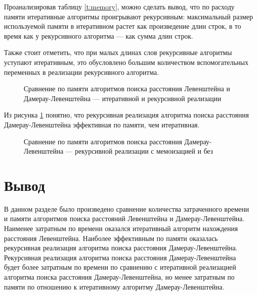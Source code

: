 Проанализировав таблицу \ref{t:memory}, можно сделать вывод, что по расходу памяти итеративные алгоритмы 
проигрывают рекурсивным: максимальный размер используемой памяти в итеративном растет как произведение длин строк,
в то время как у рекурсивного алгоритма — как сумма длин строк.

Также стоит отметить, что при малых длинах слов рекурсивные алгоритмы уступают итеративным, это обусловлено большим 
количеством вспомогательных переменных в реализации рекурсивного алгоритма.

\begin{figure}[H]
	\centering
	
	\caption{Сравнение по памяти алгоритмов поиска расстояния Левенштейна и Дамерау-Левенштейна --- итеративной и рекурсивной реализации}
	\label{plt:memory_mat_rec}
\end{figure}

Из рисунка \ref{plt:memory_mat_rec} понятно, что рекурсивная реализация алгоритма поиска расстояния Дамерау-Левенштейна эффективная по памяти, чем итеративная.

\begin{figure}[H]
	\centering
	
	\caption{Сравнение по памяти алгоритмов поиска расстояния Дамерау-Левенштейна --- рекурсивной реализации с мемоизацией и без}
	\label{plt:memory_rec}
\end{figure}

\clearpage

\section{Вывод}

В данном разделе было произведено сравнение количества затраченного времени и памяти алгоритмов поиска расстояний Левенштейна и Дамерау-Левенштейна. Наименее затратным по времени оказался итеративный алгоритм нахождения расстояния Левенштейна.
Наиболее эффективным по памяти оказалась рекурсивная реализация алгоритма поиска расстояния Дамерау-Левенштейна.
Рекурсивная реализация алгоритма поиска расстояния Дамерау-Левенштейна будет более затратным по времени по сравнению с итеративной реализацией алгоритма поиска расстояния Дамерау-Левенштейна, но менее затратным по памяти по отношению к итеративному алгоритму Дамерау-Левенштейна.
